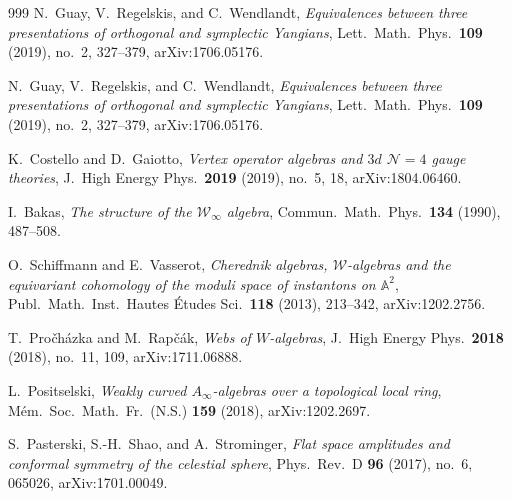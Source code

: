 \documentclass[11pt]{memoir}
\begin{document}
\begin{thebibliography}{999}
N.~Guay, V.~Regelskis, and C.~Wendlandt, \emph{Equivalences between three presentations of orthogonal and symplectic Yangians}, Lett.\ Math.\ Phys.\ \textbf{109} (2019), no.~2, 327--379, arXiv:1706.05176.



N.~Guay, V.~Regelskis, and C.~Wendlandt, \emph{Equivalences between three presentations of orthogonal and symplectic Yangians}, Lett.\ Math.\ Phys.\ \textbf{109} (2019), no.~2, 327--379, arXiv:1706.05176.

K.~Costello and D.~Gaiotto, \emph{Vertex operator algebras and $3d$ $\mathcal{N}=4$ gauge theories}, J.\ High Energy Phys.\ \textbf{2019} (2019), no.~5, 18, arXiv:1804.06460.

I.~Bakas, \emph{The structure of the $\mathcal{W}_\infty$ algebra}, Commun.\ Math.\ Phys.\ \textbf{134} (1990), 487--508.

O.~Schiffmann and E.~Vasserot, \emph{Cherednik algebras, $\mathcal{W}$-algebras and the equivariant cohomology of the moduli space of instantons on $\mathbb{A}^2$}, Publ.\ Math.\ Inst.\ Hautes \'Etudes Sci.\ \textbf{118} (2013), 213--342, arXiv:1202.2756.

T.~Pro\v{c}h\'azka and M.~Rap\v{c}\'ak, \emph{Webs of $W$-algebras}, J.\ High Energy Phys.\ \textbf{2018} (2018), no.~11, 109, arXiv:1711.06888.

L.~Positselski, \emph{Weakly curved $A_\infty$-algebras over a topological local ring}, M\'em.\ Soc.\ Math.\ Fr.\ (N.S.) \textbf{159} (2018), arXiv:1202.2697.

S.~Pasterski, S.-H.~Shao, and A.~Strominger, \emph{Flat space amplitudes and conformal symmetry of the celestial sphere}, Phys.\ Rev.\ D \textbf{96} (2017), no.~6, 065026, arXiv:1701.00049.


\end{thebibliography}
\end{document}
